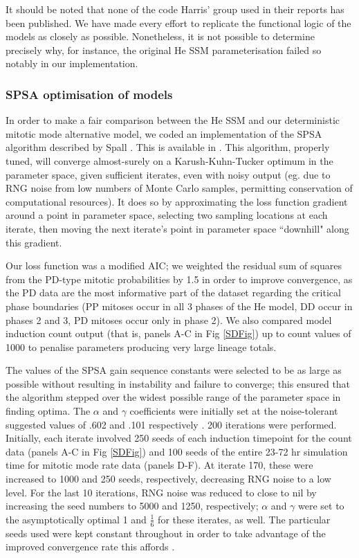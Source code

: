 \documentclass{ut-thesis}
\begin{document}
\begin{NoHyper}
It should be noted that none of the code Harris' group used in their reports has been published. We have made every effort to replicate the functional logic of the models as closely as possible. Nonetheless, it is not possible to determine precisely why, for instance, the original He SSM parameterisation failed so notably in our implementation.

\subsubsection{SPSA optimisation of models}
In order to make a fair comparison between the He SSM and our deterministic mitotic mode alternative model, we coded an implementation of the SPSA algorithm described by Spall \cite{Spall1998}. This is available in . This algorithm, properly tuned, will converge almost-surely on a Karush-Kuhn-Tucker optimum in the parameter space, given sufficient iterates, even with noisy output (eg. due to RNG noise from low numbers of Monte Carlo samples, permitting conservation of computational resources). It does so by approximating the loss function gradient around a point in parameter space, selecting two sampling locations at each iterate, then moving the next iterate's point in parameter space ``downhill" along this gradient.

 Our loss function was a modified AIC; we weighted the residual sum of squares from the PD-type mitotic probabilities by 1.5 in order to improve convergence, as the PD data are the most informative part of the dataset regarding the critical phase boundaries (PP mitoses occur in all 3 phases of the He model, DD occur in phases 2 and 3, PD mitoses occur only in phase 2). We also compared model induction count output (that is, panels A-C in Fig \ref{SDFig}) up to count values of 1000 to penalise parameters producing very large lineage totals.

 The values of the SPSA gain sequence constants were selected to be as large as possible without resulting in instability and failure to converge; this ensured that the algorithm stepped over the widest possible range of the parameter space in finding optima. The $\alpha$ and $\gamma$ coefficients were initially set at the noise-tolerant suggested values of .602 and .101 respectively \cite{Spall1998}. 200 iterations were performed. Initially, each iterate involved 250 seeds of each induction timepoint for the count data (panels A-C in Fig \ref{SDFig}) and 100 seeds of the entire 23-72 hr simulation time for mitotic mode rate data (panels D-F).  At iterate 170, these were increased to 1000 and 250 seeds, respectively, decreasing RNG noise to a low level. For the last 10 iterations, RNG noise was reduced to close to nil by increasing the seed numbers to 5000 and 1250, respectively; $\alpha$ and $\gamma$ were set to the asymptotically optimal 1 and $\frac{1}{6}$ for these iterates, as well. The particular seeds used were kept constant throughout in order to take advantage of the improved convergence rate this affords \cite{Kleinman1999}.


\end{NoHyper}
\end{document}
